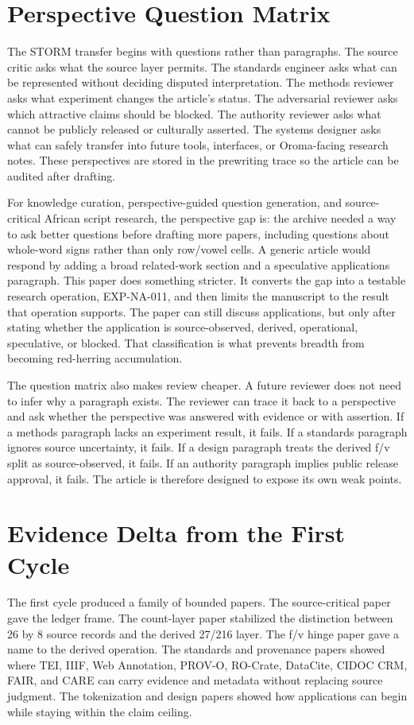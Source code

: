 \documentclass[sigconf,nonacm]{acmart}
\begin{document}
\section{Perspective Question Matrix}
The STORM transfer begins with questions rather than paragraphs. The source
critic asks what the source layer permits. The standards engineer asks what can
be represented without deciding disputed interpretation. The methods reviewer
asks what experiment changes the article's status. The adversarial reviewer asks
which attractive claims should be blocked. The authority reviewer asks what
cannot be publicly released or culturally asserted. The systems designer asks
what can safely transfer into future tools, interfaces, or Oroma-facing
research notes. These perspectives are stored in the prewriting trace so the
article can be audited after drafting.

For knowledge curation, perspective-guided question generation, and source-critical African script research, the perspective gap is: the archive needed a way to ask better questions before drafting more papers, including questions about whole-word signs rather than only row/vowel cells. A generic article would respond by
adding a broad related-work section and a speculative applications paragraph.
This paper does something stricter. It converts the gap into a testable
research operation, EXP-NA-011, and then limits the manuscript to the result
that operation supports. The paper can still discuss applications, but only
after stating whether the application is source-observed, derived, operational,
speculative, or blocked. That classification is what prevents breadth from
becoming red-herring accumulation.

The question matrix also makes review cheaper. A future reviewer does not need
to infer why a paragraph exists. The reviewer can trace it back to a perspective
and ask whether the perspective was answered with evidence or with assertion.
If a methods paragraph lacks an experiment result, it fails. If a standards
paragraph ignores source uncertainty, it fails. If a design paragraph treats the
derived f/v split as source-observed, it fails. If an authority paragraph implies
public release approval, it fails. The article is therefore designed to expose
its own weak points.

\section{Evidence Delta from the First Cycle}
The first cycle produced a family of bounded papers. The source-critical paper
gave the ledger frame. The count-layer paper stabilized the distinction between
26 by 8 source records and the derived 27/216 layer. The f/v hinge paper gave a
name to the derived operation. The standards and provenance papers showed where
TEI, IIIF, Web Annotation, PROV-O, RO-Crate, DataCite, CIDOC CRM, FAIR, and CARE
can carry evidence and metadata without replacing source judgment. The
tokenization and design papers showed how applications can begin while staying
within the claim ceiling.
\end{document}
